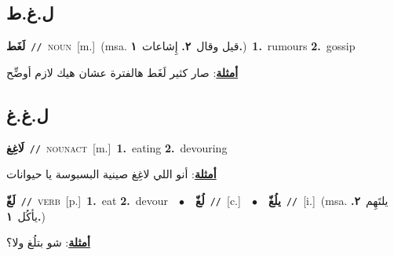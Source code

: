 \documentclass[10pt,a4paper,twoside]{article} %
\begin{document}
\begin{multicols}{2}
\vspace{-3mm}
\subsection*{\color{blue}\foreignlanguage{arabic}{ل.غ.ط}\color{blue}{}} 

{\setlength\topsep{0pt}\textbf{\foreignlanguage{arabic}{لَغَط}}\ {\color{gray}\texttt{//}\color{black}}\ \textsc{noun}\ [m.]\ \color{gray}(msa. \foreignlanguage{arabic}{قيل وقال}~\foreignlanguage{arabic}{\textbf{٢.}}  \foreignlanguage{arabic}{إِشاعات}~\foreignlanguage{arabic}{\textbf{١.}})\color{black}\ \textbf{1.}~rumours  \textbf{2.}~gossip\  \begin{flushright}\color{gray}\foreignlanguage{arabic}{\textbf{\underline{\foreignlanguage{arabic}{أمثلة}}}: صار كثير لَغَط هالفترة عشان هيك لازم أوضِّح}\end{flushright}\color{black}} \vspace{2mm}

\vspace{-3mm}
\subsection*{\color{blue}\foreignlanguage{arabic}{ل.غ.غ}\color{blue}{}} 

{\setlength\topsep{0pt}\textbf{\foreignlanguage{arabic}{لَاغِغ}}\ {\color{gray}\texttt{//}\color{black}}\ \textsc{noun\textunderscore act}\ [m.]\ \textbf{1.}~eating  \textbf{2.}~devouring\  \begin{flushright}\color{gray}\foreignlanguage{arabic}{\textbf{\underline{\foreignlanguage{arabic}{أمثلة}}}: أنو اللي لاغِغ صينية البسبوسة يا حيوانات}\end{flushright}\color{black}} \vspace{2mm}

{\setlength\topsep{0pt}\textbf{\foreignlanguage{arabic}{لَغّ}}\ {\color{gray}\texttt{//}\color{black}}\ \textsc{verb}\ [p.]\ \textbf{1.}~eat  \textbf{2.}~devour\ \ $\bullet$\ \ \setlength\topsep{0pt}\textbf{\foreignlanguage{arabic}{لُغّ}}\ {\color{gray}\texttt{//}\color{black}}\ [c.]\ \ $\bullet$\ \ \setlength\topsep{0pt}\textbf{\foreignlanguage{arabic}{يلُغّ}}\ {\color{gray}\texttt{//}\color{black}}\ [i.]\ \color{gray}(msa. \foreignlanguage{arabic}{يلتَهِم}~\foreignlanguage{arabic}{\textbf{٢.}}  \foreignlanguage{arabic}{يأكُل}~\foreignlanguage{arabic}{\textbf{١.}})\color{black}\  \begin{flushright}\color{gray}\foreignlanguage{arabic}{\textbf{\underline{\foreignlanguage{arabic}{أمثلة}}}: شو بتلُغ ولا؟}\end{flushright}\color{black}} \vspace{2mm}


\end{multicols}
\end{document}
